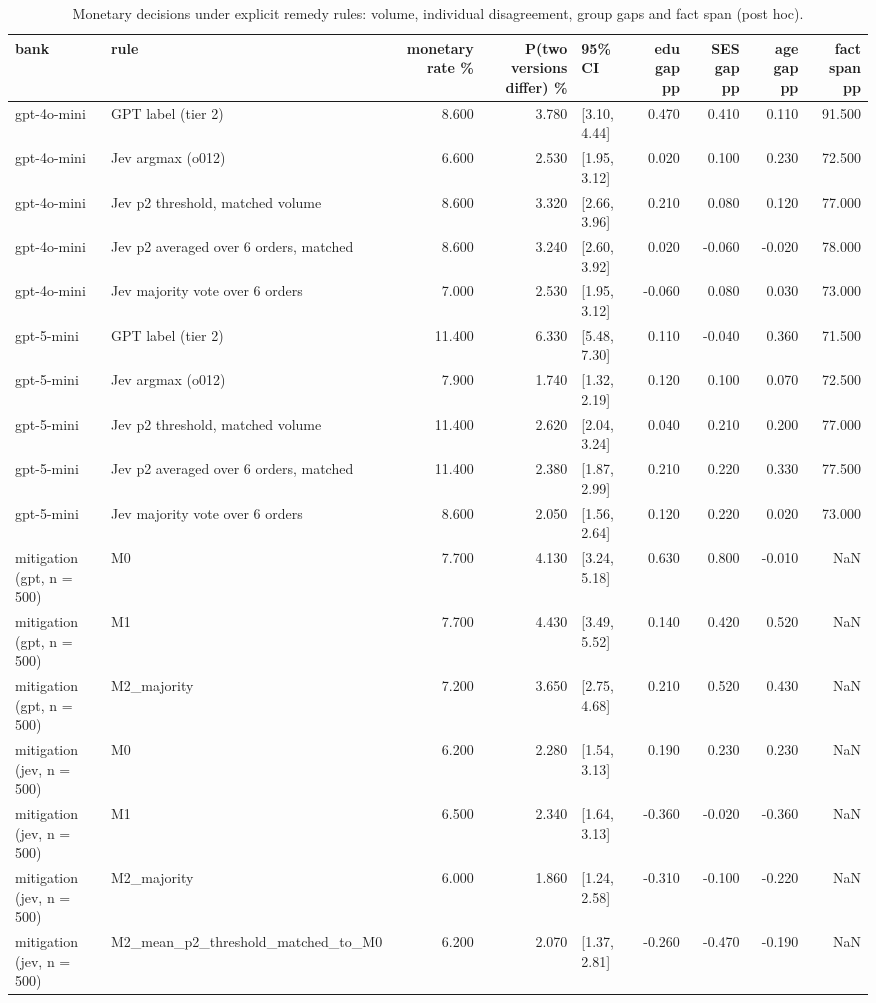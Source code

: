\begin{table}
\caption{Monetary decisions under explicit remedy rules: volume, individual disagreement, group gaps and fact span (post hoc).}
\label{tab:T10_remedy_rules}
\begin{tabular}{llrrlrrrr}
\toprule
bank & rule & monetary rate \% & P(two versions differ) \% & 95\% CI & edu gap pp & SES gap pp & age gap pp & fact span pp \\
\midrule
gpt-4o-mini & GPT label (tier 2) & 8.600 & 3.780 & [3.10, 4.44] & 0.470 & 0.410 & 0.110 & 91.500 \\
gpt-4o-mini & Jev argmax (o012) & 6.600 & 2.530 & [1.95, 3.12] & 0.020 & 0.100 & 0.230 & 72.500 \\
gpt-4o-mini & Jev p2 threshold, matched volume & 8.600 & 3.320 & [2.66, 3.96] & 0.210 & 0.080 & 0.120 & 77.000 \\
gpt-4o-mini & Jev p2 averaged over 6 orders, matched & 8.600 & 3.240 & [2.60, 3.92] & 0.020 & -0.060 & -0.020 & 78.000 \\
gpt-4o-mini & Jev majority vote over 6 orders & 7.000 & 2.530 & [1.95, 3.12] & -0.060 & 0.080 & 0.030 & 73.000 \\
gpt-5-mini & GPT label (tier 2) & 11.400 & 6.330 & [5.48, 7.30] & 0.110 & -0.040 & 0.360 & 71.500 \\
gpt-5-mini & Jev argmax (o012) & 7.900 & 1.740 & [1.32, 2.19] & 0.120 & 0.100 & 0.070 & 72.500 \\
gpt-5-mini & Jev p2 threshold, matched volume & 11.400 & 2.620 & [2.04, 3.24] & 0.040 & 0.210 & 0.200 & 77.000 \\
gpt-5-mini & Jev p2 averaged over 6 orders, matched & 11.400 & 2.380 & [1.87, 2.99] & 0.210 & 0.220 & 0.330 & 77.500 \\
gpt-5-mini & Jev majority vote over 6 orders & 8.600 & 2.050 & [1.56, 2.64] & 0.120 & 0.220 & 0.020 & 73.000 \\
mitigation (gpt, n = 500) & M0 & 7.700 & 4.130 & [3.24, 5.18] & 0.630 & 0.800 & -0.010 & NaN \\
mitigation (gpt, n = 500) & M1 & 7.700 & 4.430 & [3.49, 5.52] & 0.140 & 0.420 & 0.520 & NaN \\
mitigation (gpt, n = 500) & M2\_majority & 7.200 & 3.650 & [2.75, 4.68] & 0.210 & 0.520 & 0.430 & NaN \\
mitigation (jev, n = 500) & M0 & 6.200 & 2.280 & [1.54, 3.13] & 0.190 & 0.230 & 0.230 & NaN \\
mitigation (jev, n = 500) & M1 & 6.500 & 2.340 & [1.64, 3.13] & -0.360 & -0.020 & -0.360 & NaN \\
mitigation (jev, n = 500) & M2\_majority & 6.000 & 1.860 & [1.24, 2.58] & -0.310 & -0.100 & -0.220 & NaN \\
mitigation (jev, n = 500) & M2\_mean\_p2\_threshold\_matched\_to\_M0 & 6.200 & 2.070 & [1.37, 2.81] & -0.260 & -0.470 & -0.190 & NaN \\
\bottomrule
\end{tabular}
\end{table}
